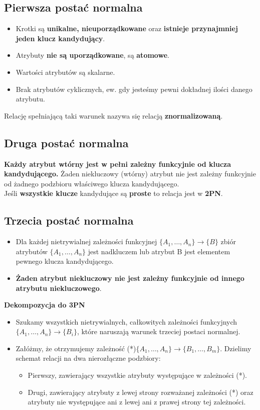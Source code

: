 \documentclass[a4paper]{article}
\begin{document}
\subsection{Pierwsza postać normalna}
\begin{itemize}
    \item Krotki są \textbf{unikalne, nieuporządkowane} oraz \textbf{istnieje przynajmniej jeden klucz kandydujący}.
    \item Atrybuty \textbf{nie są uporządkowane}, są \textbf{atomowe}.
    \item Wartości atrybutów są skalarne.
    \item Brak atrybutów cyklicznych, ew. gdy jesteśmy pewni dokładnej ilości danego atrybutu.
\end{itemize}
Relację spełniającą taki warunek nazywa się relacją
\textbf{znormalizowaną}.

\subsection{Druga postać normalna}
\textbf{Każdy atrybut wtórny jest w pełni zależny funkcyjnie od klucza kandydującego.}
Żaden niekluczowy (wtórny) atrybut nie jest zależny funkcyjnie od żadnego podzbioru właściwego klucza kandydującego.\\

Jeśli \textbf{wszystkie klucze} kandydujące są \textbf{proste} to relacja jest w \textbf{2PN}.

\subsection{Trzecia postać normalna}
\begin{itemize}
    \item Dla każdej nietrywialnej zależności funkcyjnej $\{A_1,\dots,A_n\} \rightarrow \{B\}$ zbiór atrybutów $\{A_1,\dots,A_n\}$ jest nadkluczem lub atrybut B jest elementem pewnego klucza kandydującego.
    \item \textbf{Żaden atrybut niekluczowy nie jest zależny funkcyjnie od innego atrybutu niekluczowego}.
\end{itemize}

\textbf{Dekompozycja do 3PN}
\begin{itemize}
    \item Szukamy wszystkich nietrywialnych, całkowitych zależności funkcyjnych $\{A_1,\dots,A_n\} \rightarrow \{B_i\}$, które naruszają warunek trzeciej postaci normalnej. 
    \item Załóżmy, że otrzymujemy zależność (*)$\{A_1,\dots,A_n\} \rightarrow \{B_1, \dots, B_m\}$. Dzielimy schemat relacji na dwa nierozłączne podzbiory:
    \begin{itemize}
        \item Pierwszy, zawierający wszystkie atrybuty występujące w zależności (*).
        \item Drugi, zawierający atrybuty z lewej strony rozważanej zależności (*) oraz atrybuty nie występujące ani z lewej ani z prawej strony tej zależności. 
    \end{itemize}
\end{itemize}
\end{document}
